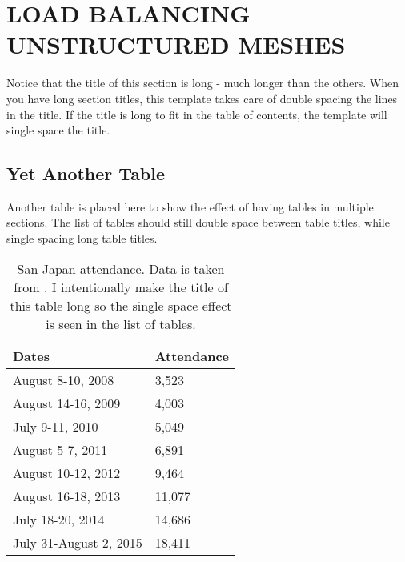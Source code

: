 %
%
%
%

\chapter{LOAD BALANCING UNSTRUCTURED MESHES}

Notice that the title of this section is long - much longer than the others. When you have long section titles, this template takes care of double spacing the lines in the title. If the title is long to fit in the table of contents, the template will single space the title.

\section{Yet Another Table}

Another table is placed here to show the effect of having tables in multiple sections. The list of tables should still double space between table titles, while single spacing long table titles.

\begin{table}[h!]
	\centering
	\begin{tabular}{|l|l|}
		\hline
		Dates & Attendance  \\ \hline
		August 8-10, 2008 & 3,523  \\ \hline
		August 14-16, 2009 & 4,003 \\ \hline
		July 9-11, 2010 & 5,049 \\ \hline
		August 5-7, 2011 & 6,891  \\ \hline
		August 10-12, 2012 & 9,464  \\ \hline
		August 16-18, 2013 & 11,077  \\ \hline
		July 18-20, 2014 & 14,686 \\ \hline
		July 31-August 2, 2015 & 18,411  \\ \hline
	\end{tabular}
	\caption{San Japan attendance. Data is taken from \cite{ANCONS}. I intentionally make the title of this table long so the single space effect is seen in the list of tables.}
\end{table}

